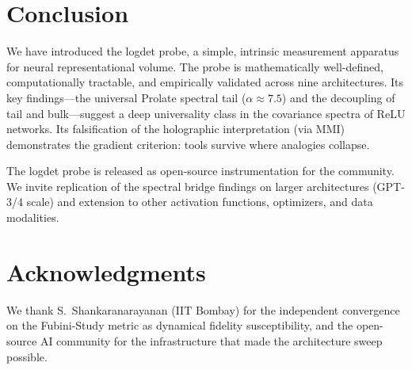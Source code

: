 \documentclass[12pt,a4paper]{article}
\begin{document}
\section{Conclusion}

We have introduced the logdet probe, a simple, intrinsic measurement apparatus for neural representational volume. The probe is mathematically well-defined, computationally tractable, and empirically validated across nine architectures. Its key findings---the universal Prolate spectral tail ($\alpha \approx 7.5$) and the decoupling of tail and bulk---suggest a deep universality class in the covariance spectra of ReLU networks. Its falsification of the holographic interpretation (via MMI) demonstrates the gradient criterion: tools survive where analogies collapse.

The logdet probe is released as open-source instrumentation for the community. We invite replication of the spectral bridge findings on larger architectures (GPT-3/4 scale) and extension to other activation functions, optimizers, and data modalities.


\section*{Acknowledgments}

We thank S.~Shankaranarayanan (IIT Bombay) for the independent convergence on the Fubini-Study metric as dynamical fidelity susceptibility, and the open-source AI community for the infrastructure that made the architecture sweep possible.

\end{document}
